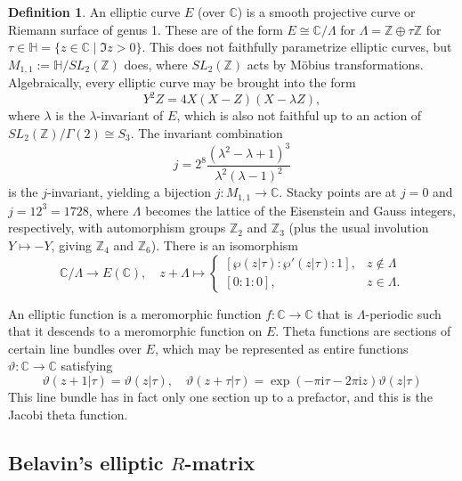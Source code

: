 \documentclass[11pt]{report}
\theoremstyle{definition}
\newtheorem{definition}[theorem]{Definition}
\theoremstyle{remark}
\theoremstyle{remark}
\newcommand{\Z}{\mathbb{Z}}
\newcommand{\C}{\mathbb{C}}
\newcommand{\I}{\mathrm{i}}
\begin{document}
\begin{definition}
An elliptic curve $E$ (over $\C$) is a smooth projective curve or Riemann surface of genus 1. These are of the form $E \cong \C/\Lambda$ for $\Lambda = \Z \oplus \tau \Z$ for $\tau \in \mathbb{H} = \{ z \in \C \mid \Im z > 0 \}$. This does not faithfully parametrize elliptic curves, but $M_{1,1} := \mathbb{H}/SL_2(\Z)$ does, where $SL_2(\Z)$ acts by Möbius transformations. Algebraically, every elliptic curve may be brought into the form
\begin{equation*}
Y^2 Z = 4 X(X-Z)(X-\lambda Z),
\end{equation*}
where $\lambda$ is the $\lambda$-invariant of $E$, which is also not faithful up to an action of $SL_2(\Z)/\Gamma(2) \cong S_3$. The invariant combination
\begin{equation*}
j = 2^8 \frac{(\lambda^2-\lambda+1)^3}{\lambda^2(\lambda-1)^2}
\end{equation*}
is the $j$-invariant, yielding a bijection $j: M_{1,1} \to \C$. Stacky points are at $j=0$ and $j=12^3=1728$, where $\Lambda$ becomes the lattice of the Eisenstein and Gauss integers, respectively, with automorphism groups $\Z_2$ and $\Z_3$ (plus the usual involution $Y \mapsto -Y$, giving $\Z_4$ and $\Z_6$). There is an isomorphism
\begin{equation*}
\C/\Lambda \to E(\C), \quad z+\Lambda \mapsto
\begin{cases}
[\wp(z|\tau):\wp'(z|\tau):1], & z \notin \Lambda \\
[0:1:0], & z \in \Lambda.
\end{cases}
\end{equation*}

An elliptic function is a meromorphic function $f: \C \to \C$ that is $\Lambda$-periodic such that it descends to a meromorphic function on $E$. Theta functions are sections of certain line bundles over $E$, which may be represented as entire functions $\vartheta: \C \to \C$ satisfying
\begin{equation*}
\vartheta(z+1|\tau) = \vartheta(z|\tau), \quad \vartheta(z+\tau|\tau) = \exp(- \pi \I \tau - 2 \pi \I z) \vartheta(z|\tau)
\end{equation*}
This line bundle has in fact only one section up to a prefactor, and this is the Jacobi theta function.
\end{definition}

\subsection{Belavin's elliptic $R$-matrix}
\end{document}
